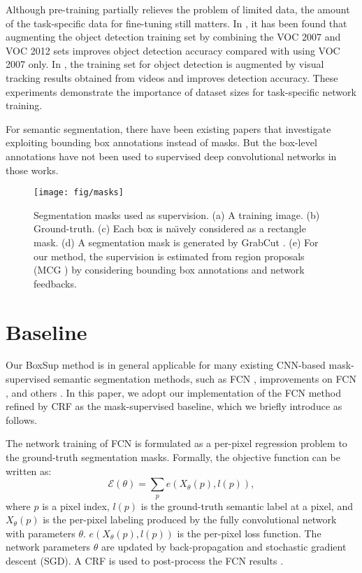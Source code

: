 \documentclass[10pt,twocolumn,letterpaper]{article}
\begin{document}
Although pre-training partially relieves the problem of limited data, the amount of the task-specific data for fine-tuning still matters. In \cite{agrawal2014analyzing}, it has been found that augmenting the object detection training set by combining the VOC 2007 and VOC 2012 sets improves object detection accuracy compared with using VOC 2007 only. In \cite{Liang2014}, the training set for object detection is augmented by visual tracking results obtained from videos and improves detection accuracy. These experiments demonstrate the importance of dataset sizes for task-specific network training.

For semantic segmentation, there have been existing papers \cite{xia2013semantic,guillaumin2014imagenet} that investigate exploiting bounding box annotations instead of masks. But the box-level annotations have not been used to supervised deep convolutional networks in those works.

\begin{figure*}[t]
	\centering
	\texttt{[image: fig/masks]}
	\caption{Segmentation masks used as supervision. (a) A training image. (b) Ground-truth. (c) Each box is na\"{\i}vely considered as a rectangle mask. (d) A segmentation mask is generated by GrabCut \cite{rother2004grabcut}. (e) For our method, the supervision is estimated from region proposals (MCG \cite{arbelaez2014multiscale}) by considering bounding box annotations and network feedbacks.}
	\label{fig:masks}
\end{figure*}

\section{Baseline}
\label{sec:baseline}

Our BoxSup method is in general applicable for many existing CNN-based mask-supervised semantic segmentation methods, such as FCN \cite{Long2015}, improvements on FCN \cite{Chen2015,zheng2015conditional}, and others
\cite{Hariharan2015,Dai2015,mostajabi2014feedforward}. In this paper, we adopt our implementation of the FCN method \cite{Long2015} refined by CRF \cite{Chen2015} as the mask-supervised baseline, which we briefly introduce as follows.

The network training of FCN \cite{Long2015} is formulated as a per-pixel regression problem to the ground-truth segmentation masks. Formally, the objective function can be written as:
\begin{equation}
\mathcal{E}(\theta) = \sum_{p} e(X_{\theta}(p), l(p)),
\label{eq:fcn_loss}
\end{equation}
where $p$ is a pixel index, $l(p)$ is the ground-truth semantic label at a pixel, and $X_{\theta}(p)$ is the per-pixel labeling produced by the fully convolutional network with parameters $\theta$.
$e(X_{\theta}(p), l(p))$ is the per-pixel loss function. The network parameters $\theta$ are updated by back-propagation and stochastic gradient descent (SGD). A CRF is used to post-process the FCN results \cite{Chen2015}.
\end{document}
